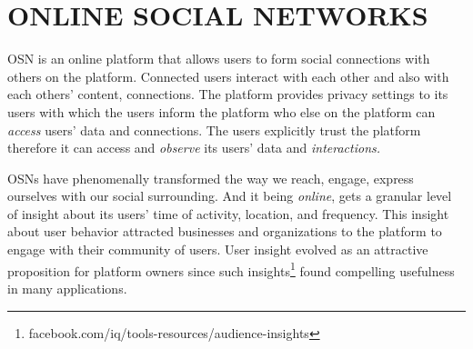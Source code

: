 \documentclass[runningheads]{llncs}
\begin{document}











\section{ONLINE SOCIAL NETWORKS}
\label{sec:social-networks}
\noindent OSN is an online platform that allows users to form social
connections with others on the platform. Connected users interact with
each other and also with each others' content, connections. The
platform provides privacy settings to its users with which the users
inform the platform who else on the platform can \textit{access}
users' data and connections. The users explicitly trust the platform
therefore it can access and \textit{observe} its users' data and
\textit{interactions.}

OSNs have phenomenally transformed the way we reach, engage, express
ourselves with our social surrounding. And it being \textit{online},
gets a granular level of insight about its users' time of activity,
location, and frequency. This insight about user behavior attracted
businesses and organizations to the platform to engage with their
community of users. User insight evolved as an attractive proposition
for platform owners since such
insights\footnote{facebook.com/iq/tools-resources/audience-insights}
found compelling usefulness in many applications.
\end{document}
